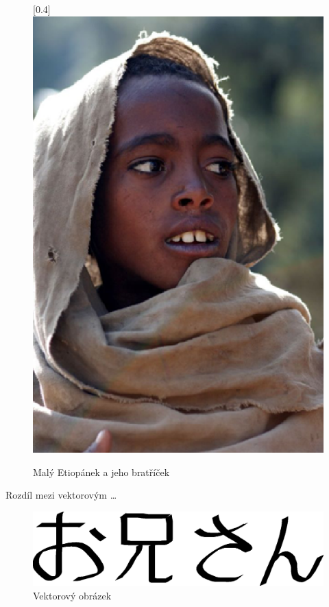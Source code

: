 \documentclass[11pt, a4paper]{article}
\begin{document}
\begin{figure}[h]
    \scalebox{-0.4}[0.4]{\includegraphics{etiopan.eps}}
    \caption{Malý Etiopánek a jeho bratříček}
\end{figure}

\newpage

Rozdíl mezi vektorovým \dots  \\

\begin{figure}[h!]
    \centering
    \includegraphics[scale=0.4]{oniisan.eps}
    \caption{Vektorový obrázek}
\end{figure}
\end{document}
